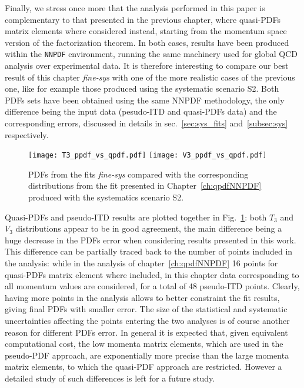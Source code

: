 %
Finally, we stress once more that the analysis performed in this paper is complementary to that 
presented in the previous chapter, where quasi-PDFs matrix elements where considered instead, 
starting from the momentum space version of the factorization theorem. 
In both cases, results have been produced within the {\tt NNPDF} environment,
running the same machinery used for global QCD analysis over experimental data. 
It is therefore interesting to compare our best result of this chapter \textit{fine-sys} with
one of the more realistic cases of the previous one, like for example those produced using the
systematic scenario S2. 
Both PDFs sets have been obtained using the same NNPDF methodology, the only difference 
being the input data (pesudo-ITD and quasi-PDFs data) and the corresponding errors,
discussed in details in sec.~\ref{sec:sys_fits} and~\ref{subsec:sys} respectively.
\begin{figure}[h!]
    \center
    \texttt{[image: T3\_ppdf\_vs\_qpdf.pdf]}
    \texttt{[image: V3\_ppdf\_vs\_qpdf.pdf]}
    \caption{PDFs from the fits \textit{fine-sys} compared with the corresponding distributions from 
    the fit presented in Chapter~\ref{ch:qpdfNNPDF} produced with the systematics scenario S2.}
    \label{fig::ppdf_vs_qpdf}
\end{figure} 
Quasi-PDFs and pseudo-ITD results are plotted together in Fig.~\ref{fig::ppdf_vs_qpdf}: 
both $T_3$ and $V_3$ distributions appear to be in good agreement, the main difference being a huge decrease in the 
PDFs error when considering results presented in this work. 
This difference can be partially traced back to the number of points included in the analysis: while in the analysis of 
chapter~\ref{ch:qpdfNNPDF} 16 points for quasi-PDFs matrix element where included, 
in this chapter data corresponding to all momentum values are considered, for a total of 48 pseudo-ITD points.
Clearly, having more points in the analysis allows to better constraint the fit results, giving final PDFs with smaller error.
%
The size of the statistical and systematic uncertainties affecting the points entering the two analyses is of course another
reason for different PDFs error.
In general it is expected that, given equivalent computational cost,
the low momenta matrix elements, which are used in the pseudo-PDF approach,
are exponentially more precise than the large momenta matrix elements, to which the quasi-PDF approach are restricted. 
However a detailed study of such differences is left for a future study.


